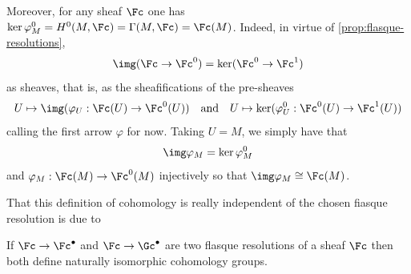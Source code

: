 Moreover, for any sheaf $\Fc$ one has $\ker\varphi_M^0=H^0(M,\Fc)=\Gamma(M,\Fc)=\Fc(M)$. Indeed, in virtue of \cref{prop:flasque-resolutions}, \[\img(\Fc\to\Fc^0)=\ker(\Fc^0\to\Fc^1)\]
as sheaves, that is, as the sheafifications of the pre-sheaves
\[U\mapsto\img (\varphi_U:\Fc(U)\to\Fc^0(U))\quad \text{and}\quad U\mapsto\ker(\varphi^0_U:\Fc^0(U)\to\Fc^1(U))\]
calling the first arrow $\varphi$ for now. Taking $U=M$, we simply have that
\[\img\varphi_M=\ker\varphi^0_M\]
and $\varphi_M:\Fc(M)\to\Fc^0(M)$ injectively so that $\img\varphi_M\cong\Fc(M)$.

That this definition of cohomology is really independent of the chosen fiasque resolution is due to
\begin{prop}
	If $\Fc\to\Fc^\bullet$ and $\Fc\to\Gc^\bullet$ are two flasque resolutions of a sheaf $\Fc$ then both define naturally isomorphic cohomology groups.
\end{prop}

